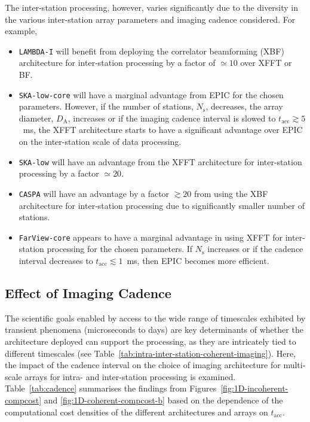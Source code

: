 \documentclass[
  journal=pasa,
  manuscript=article-type,
  year=2020,
  volume=37,
]{cup-journal}
\begin{document}
The inter-station processing, however, varies significantly due to the diversity in the various inter-station array parameters and imaging cadence considered. For example, 
\begin{itemize}
    \item \texttt{LAMBDA-I} will benefit from deploying the correlator beamforming (XBF) architecture for inter-station processing by a factor of $\simeq 10$ over XFFT or BF. 
    \item \texttt{SKA-low-core} will have a marginal advantage from EPIC for the chosen parameters. However, if the number of stations, $N_\textrm{s}$, decreases,  the array diameter, $D_\textrm{A}$, increases or if the imaging cadence interval is slowed to $t_\textrm{acc} \gtrsim 5$~ms, the XFFT architecture starts to have a significant advantage over EPIC on the inter-station scale of data processing. 
    \item \texttt{SKA-low} will have an advantage from the XFFT architecture for inter-station processing by a factor $\simeq 20$.
    \item \texttt{CASPA} will have an advantage by a factor $\gtrsim 20$ from using the XBF architecture for inter-station processing due to significantly smaller number of stations.
    \item \texttt{FarView-core} appears to have a marginal advantage in using XFFT for inter-station processing for the chosen parameters. If $N_\textrm{s}$ increases or if the cadence interval decreases to $t_\textrm{acc}\lesssim 1$~ms, then EPIC becomes more efficient. 
\end{itemize}

\subsection{Effect of Imaging Cadence}\label{sec:cadence}

The scientific goals enabled by access to the wide range of timescales exhibited by transient phenomena (microseconds to days) are key determinants of whether the architecture deployed can support the processing, as they are intricately tied to different timescales (see Table~\ref{tab:intra-inter-station-coherent-imaging}). Here, the impact of the cadence interval on the choice of imaging architecture for multi-scale arrays for intra- and inter-station processing is examined. Table~\ref{tab:cadence} summarises the findings from Figures~\ref{fig:1D-incoherent-compcost} and \ref{fig:1D-coherent-compcost-b} based on the dependence of the computational cost densities of the different architectures and arrays on $t_\textrm{acc}$.
\end{document}
